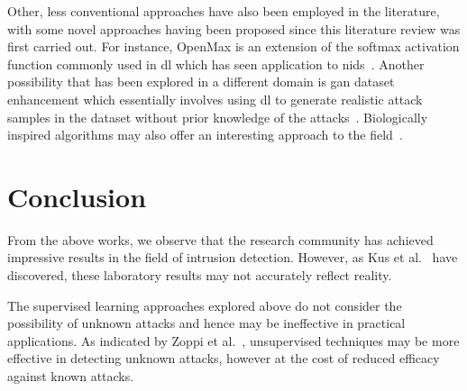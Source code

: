 Other, less conventional approaches have also been employed in the literature,
with some novel approaches having been proposed since this literature review
was first carried out. For instance, OpenMax is an extension of the softmax
activation function commonly used in \gls{dl} which has seen application to
\gls{nids}~\cite{openmax}. Another possibility that has been explored in a
different domain is \gls{gan} dataset enhancement which essentially involves
using \gls{dl} to generate realistic attack samples in the dataset without
prior knowledge of the attacks~\cite{gan_enhancement}. Biologically inspired
algorithms may also offer an interesting approach to the field~\cite{AIm}.

\section{Conclusion}%
\label{sec:conclusion2}
From the above works, we observe that the research community has achieved
impressive results in the field of intrusion detection. However, as Kus et
al.~\cite{Kus} have discovered, these laboratory results may not accurately
reflect reality.

The supervised learning approaches explored above do not consider the
possibility of unknown attacks and hence may be ineffective in practical
applications. As indicated by Zoppi et al.~\cite{Zoppi}, unsupervised
techniques may be more effective in detecting unknown attacks, however at the
cost of reduced efficacy against known attacks.
